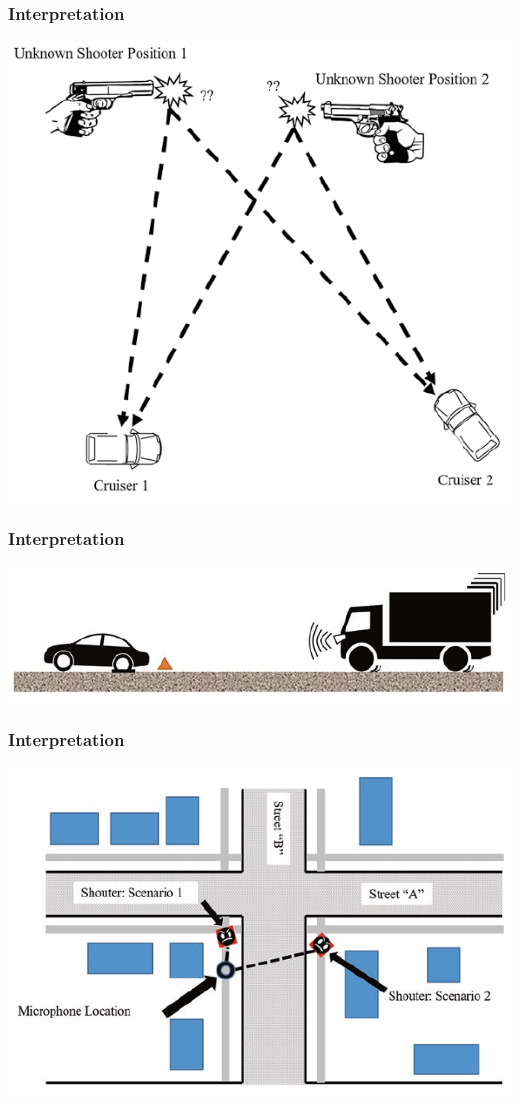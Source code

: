 \documentclass[pdflatex,compress]{beamer}
\begin{document}
\begin{frame}
	\frametitle{Interpretation}
	
	\begin{center}
		\includegraphics[width=0.6\linewidth]{img/img007}
	\end{center}
	
\end{frame}

\begin{frame}
	\frametitle{Interpretation}
	
	\begin{center}
		\includegraphics[width=0.8\linewidth]{img/img008}
	\end{center}
	
\end{frame}

\begin{frame}
	\frametitle{Interpretation}
	
	\begin{center}
		\includegraphics[width=0.8\linewidth]{img/img009}
	\end{center}
	
\end{frame}
\end{document}
